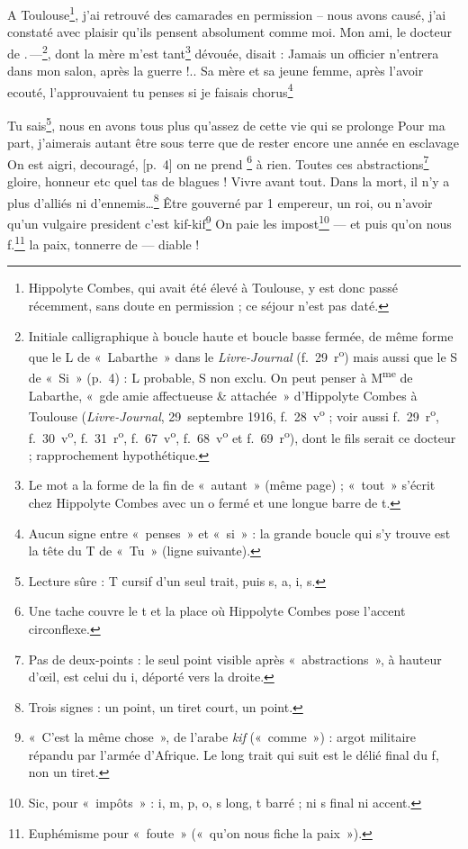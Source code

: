 \begin{LJlettre}
A Toulouse\footnote{Hippolyte Combes, qui avait été élevé à Toulouse, y est donc passé récemment, sans doute en permission ; ce séjour n'est pas daté.}, j'ai retrouvé des camarades en permission -- nous avons causé, j'ai constaté avec plaisir qu'ils pensent absolument comme moi. Mon ami, le docteur de .\,—\footnote{Initiale calligraphique à boucle haute et boucle basse fermée, de même forme que le L de «~Labarthe~» dans le \textit{Livre-Journal} (f.~29~r\textsuperscript{o}) mais aussi que le S de «~Si~» (p.~4) : L probable, S non exclu. On peut penser à M\textsuperscript{me} de Labarthe, «~gde amie affectueuse \& attachée~» d'Hippolyte Combes à Toulouse (\textit{Livre-Journal}, 29~septembre 1916, f.~28~v\textsuperscript{o} ; voir aussi f.~29~r\textsuperscript{o}, f.~30~v\textsuperscript{o}, f.~31~r\textsuperscript{o}, f.~67~v\textsuperscript{o}, f.~68~v\textsuperscript{o} et f.~69~r\textsuperscript{o}), dont le fils serait ce docteur ; rapprochement hypothétique.}, dont la mère m'est tant\footnote{Le mot a la forme de la fin de «~autant~» (même page) ; «~tout~» s'écrit chez Hippolyte Combes avec un o fermé et une longue barre de t.} dévouée, disait : Jamais un officier n'entrera dans mon salon, après la guerre !.. Sa mère et sa jeune femme, après l'avoir ecouté, l'approuvaient tu penses si je faisais chorus\footnote{Aucun signe entre «~penses~» et «~si~» : la grande boucle qui s'y trouve est la tête du T de «~Tu~» (ligne suivante).}

Tu sais\footnote{Lecture sûre : T cursif d'un seul trait, puis s, a, i, s.}, nous en avons tous plus qu'assez de cette vie qui se prolonge Pour ma part, j'aimerais autant être sous terre que de rester encore une année en esclavage On est aigri, decouragé, [p.~4] on ne prend \footnote{Une tache couvre le t et la place où Hippolyte Combes pose l'accent circonflexe.} à rien. Toutes ces abstractions\footnote{Pas de deux-points : le seul point visible après «~abstractions~», à hauteur d'œil, est celui du i, déporté vers la droite.} gloire, honneur etc quel tas de blagues ! Vivre avant tout. Dans la mort, il n'y a plus d'alliés ni d'ennemis\ldots\footnote{Trois signes : un point, un tiret court, un point.} Être gouverné par 1 empereur, un roi, ou n'avoir qu'un vulgaire president c'est kif-kif\footnote{«~C'est la même chose~», de l'arabe \textit{kif} («~comme~») : argot militaire répandu par l'armée d'Afrique. Le long trait qui suit est le délié final du f, non un tiret.} On paie les impost\footnote{Sic, pour «~impôts~» : i, m, p, o, s long, t barré ; ni s final ni accent.} — et puis qu'on nous f.\footnote{Euphémisme pour «~foute~» («~qu'on nous fiche la paix~»).} la paix, tonnerre de — diable !


\end{LJlettre}
